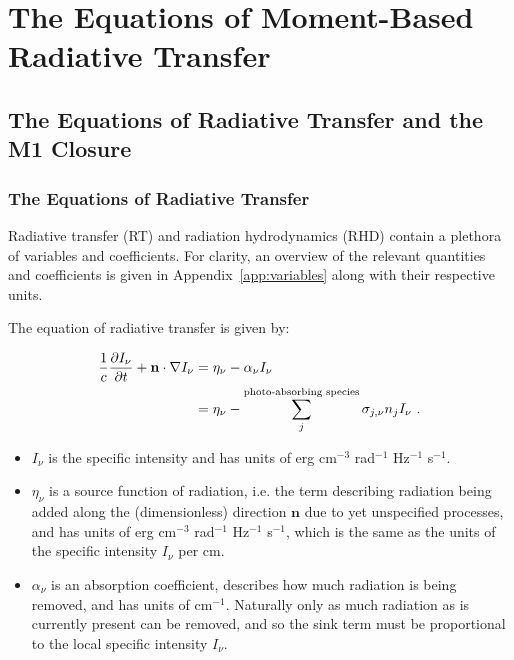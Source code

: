 \section{The Equations of Moment-Based Radiative Transfer}\label{chap:rt-equations}


\subsection{The Equations of Radiative Transfer and the M1 Closure}


\subsubsection{The Equations of Radiative Transfer}


Radiative transfer (RT) and radiation hydrodynamics (RHD) contain a plethora of variables and
coefficients. For clarity, an overview of the relevant quantities and coefficients is given
in Appendix~\ref{app:variables} along with their respective units.


The equation of radiative transfer is given by:

\begin{align}
    \frac{1}{c} \frac{\partial I_\nu}{\partial t} + \mathbf{n} \cdot \nabla I_\nu
        &= \eta_\nu - \alpha_\nu I_\nu \nonumber \\
        &= \eta_\nu - \sum_j^{\text{photo-absorbing\ species}} \sigma_{j,\nu} n_j I_\nu \ .
\label{eq:RT-sigma}
\end{align}

\begin{itemize}
\item $I_\nu$ is the specific intensity and has units of erg cm$^{-3}$ rad$^{-1}$ Hz$^{-1}$
s$^{-1}$.
\item $\eta_\nu$ is a source function of radiation, i.e. the term describing radiation being added
along the (dimensionless) direction $\mathbf{n}$ due to yet unspecified processes, and has units of
erg cm$^{-3}$ rad$^{-1}$ Hz$^{-1}$ s$^{-1}$, which is the same as the units of the specific
intensity $I_\nu$ per cm.
\item $\alpha_\nu$ is an absorption coefficient, describes how much radiation is being removed, and
has units of cm$^{-1}$. Naturally only as much radiation as is currently present can be removed, and
so the sink term must be proportional to the local specific intensity $I_\nu$.
\end{itemize}


